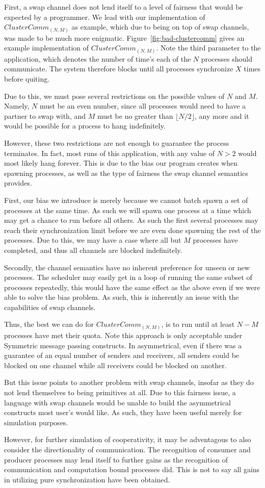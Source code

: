 First, a swap channel does not lend itself to a level of fairness that would be
expected by a programmer. We lead with our implementation of 
$ClusterComm_{(N,M)}$ as example, which due to being on top of swap channels, 
was made to be much more enigmatic. Figure~\ref{fig:bad-clustercomm} gives an
example implementation of $ClusterComm_{(N,M)}$. Note the third parameter to
the application, which denotes the number of time's each of the $N$ processes
should communicate. The system therefore blocks until all processes synchronize
$X$ times before quiting.

Due to this, we must pose several restrictions on the possible values of $N$ and
$M$. Namely, $N$ must be an even number, since all processes would need to have a 
partner to swap with, and $M$ must be no greater than $\lfloor N/2 \rfloor$, any
more and it would be possible for a process to hang indefinitely.

However, these two restrictions are not enough to guarantee the process terminates.
In fact, most runs of this application, with any value of $N > 2$ would most 
likely hang forever. This is due to the bias our program creates when spawning
processes, as well as the type of fairness the swap channel semantics provides.

First, our bias we introduce is merely because we cannot batch spawn a set of
processes at the same time. As such we will spawn one process at a time which
may get a chance to run before all others. As such the first several processes
may reach their synchronization limit before we are even done spawning the rest
of the processes. Due to this, we may have a case where all but $M$ processes
have completed, and thus all channels are blocked indefinitely.

Secondly, the channel semantics have no inherent preference for unseen 
or new processes. The scheduler may easily get in a loop of running the same
subset of processes repeatedly, this would have the same effect as the above
even if we were able to solve the bias problem. As such, this is inherently an
issue with the capabilities of swap channels. 

Thus, the best we can do for $ClusterComm_{(N,M)}$, is to run until at least 
$N-M$ processes have met their quota. Note this approach is only acceptable 
under Symmetric message passing constructs. In asymmetrical, even if there was
a guarantee of an equal number of senders and receivers, all senders could be
blocked on one channel while all receivers could be blocked on another. 

But this issue points to another problem with swap channels, insofar as they do
not lend themselves to being primitives at all. Due to this fairness issue, a 
language with swap channels would be unable to build the asymmetrical constructs
most user's would like. As such, they have been useful merely for simulation 
purposes.

However, for further simulation of cooperativity, it may be adventagous to also 
consider the directionality of communication. The recognition of consumer and 
producer processes may lend itself to further gains as the recognition of 
communication and computation bound processes did. This is not to say all gains
in utilizing pure synchronization have been obtained. 
